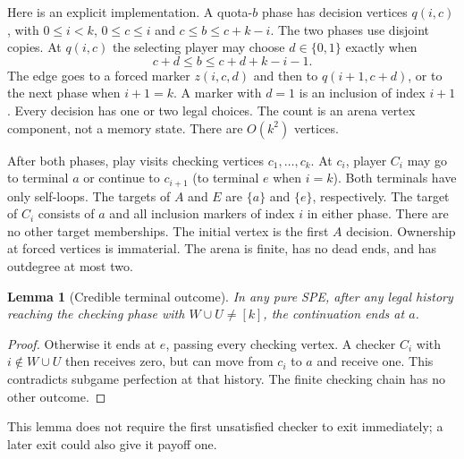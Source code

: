 \documentclass[acmlarge,11pt,screen,nonacm,natbib=false]{acmart}
\newtheorem{lemma}[theorem]{Lemma}
\theoremstyle{remark}
\begin{document}
Here is an explicit implementation. A quota-$b$ phase has decision vertices
$q(i,c)$, with $0\leq i<k$, $0\leq c\leq i$ and $c\leq b\leq c+k-i$.
The two phases use disjoint copies. At $q(i,c)$ the selecting player may
choose $d\in\{0,1\}$ exactly when
\[
                         c+d\leq b\leq c+d+k-i-1.
\]
The edge goes to a forced marker $z(i,c,d)$ and then to $q(i+1,c+d)$,
or to the next phase when $i+1=k$. A marker with $d=1$ is an inclusion
of index $i+1$. Every decision has one or two legal choices. The count is
an arena vertex component, not a memory state. There are $O(k^2)$ vertices.

After both phases, play visits checking vertices $c_1,\ldots,c_k$.
At $c_i$, player $C_i$ may go to terminal $a$ or continue to $c_{i+1}$
(to terminal $e$ when $i=k$). Both terminals have only self-loops.
The targets of $A$ and $E$ are $\{a\}$ and $\{e\}$, respectively.
The target of $C_i$ consists of $a$ and all inclusion markers of index $i$
in either phase. There are no other target memberships. The initial
vertex is the first $A$ decision. Ownership at forced vertices is immaterial.
The arena is finite, has no dead ends, and has outdegree at most two.

\begin{lemma}[Credible terminal outcome]\label{lem:checker}
In any pure SPE, after any legal history reaching the checking phase with
$W\cup U\ne[k]$, the continuation ends at $a$.
\end{lemma}
\begin{proof}
Otherwise it ends at $e$, passing every checking vertex. A checker $C_i$
with $i\notin W\cup U$ then receives zero, but can move from $c_i$ to $a$
and receive one. This contradicts subgame perfection at that history.
The finite checking chain has no other outcome.
\end{proof}

This lemma does not require the first unsatisfied checker to exit
immediately; a later exit could also give it payoff one.
\end{document}
